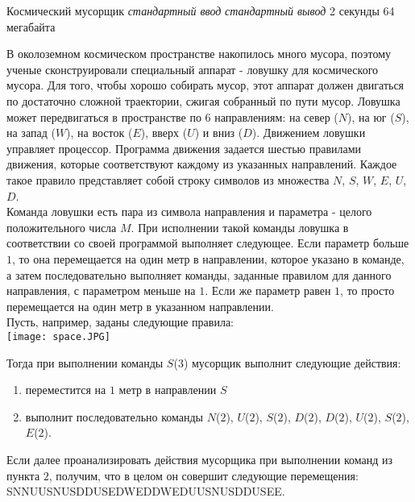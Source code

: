 \graphicspath{ {./images/} }
\begin{problem}%
{Космический мусорщик}%
{\textsl{стандартный ввод}}%
{\textsl{стандартный вывод}}%
{2 секунды}%
{64 мегабайта}%
{}

В околоземном космическом пространстве накопилось много мусора, поэтому ученые сконструировали специальный аппарат - ловушку для космического мусора. Для того, чтобы хорошо собирать мусор, этот аппарат должен двигаться по достаточно сложной траектории, сжигая собранный по пути мусор. Ловушка может передвигаться в пространстве по $6$ направлениям: на север ($N$), на юг ($S$), на запад ($W$), на восток ($E$), вверх ($U$) и вниз ($D$). Движением ловушки управляет процессор. Программа движения задается шестью правилами движения, которые соответствуют каждому из указанных направлений. Каждое такое правило представляет собой строку символов из множества {$N$, $S$, $W$, $E$, $U$, $D$}.\\

Команда ловушки есть пара из символа направления и параметра - целого положительного числа $M$. При исполнении такой команды ловушка в соответствии со своей программой выполняет следующее. Если параметр больше $1$, то она перемещается на один метр в направлении, которое указано в команде, а затем последовательно выполняет команды, заданные правилом для данного направления, с параметром меньше на $1$. Если же параметр равен $1$, то просто перемещается на один метр в указанном направлении.\\

Пусть, например, заданы следующие правила:\\

\texttt{[image: space.JPG]}

Тогда при выполнении команды $S$($3$) мусорщик выполнит следующие действия: 
\begin{enumerate}
\item переместится на $1$ метр в направлении $S$ 
\item выполнит последовательно команды $N$($2$), $U$($2$), $S$($2$), $D$($2$), $D$($2$), $U$($2$), $S$($2$), $E$($2$).
\end{enumerate}

Если далее проанализировать действия мусорщика при выполнении команд из пункта $2$, получим, что в целом он совершит следующие перемещения:\\

SNNUUSNUSDDUSEDWEDDWEDUUSNUSDDUSEE.\\


\end{problem}
